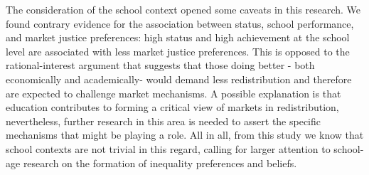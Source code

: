 \documentclass[
    behavsci,
    article,
    submit,
moreauthors
]{mdpi}
\begin{document}
The consideration of the school context opened some caveats in this
research. We found contrary evidence for the association between status,
school performance, and market justice preferences: high status and high
achievement at the school level are associated with less market justice
preferences. This is opposed to the rational-interest argument that
suggests that those doing better - both economically and academically-
would demand less redistribution \citep{runst_does_2018,bullock_education_2021,gonthier_parallel_2017} and therefore
are expected to challenge market mechanisms. A possible explanation is
that education contributes to forming a critical view of markets in
redistribution, nevertheless, further research in this area is needed to
assert the specific mechanisms that might be playing a role. All in all,
from this study we know that school contexts are not trivial in this
regard, calling for larger attention to school-age research on the
formation of inequality preferences and beliefs.




\end{document}
